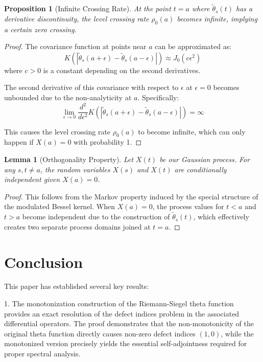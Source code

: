 \documentclass{article}
\newtheorem{lemma}[theorem]{Lemma}
\newtheorem{proposition}[theorem]{Proposition}
\theoremstyle{definition}
\begin{document}
\begin{proposition}[Infinite Crossing Rate]
At the point $t = a$ where $\tilde{\theta}_s(t)$ has a derivative discontinuity, the level crossing rate $\rho_0(a)$ becomes infinite, implying a certain zero crossing.
\end{proposition}

\begin{proof}
The covariance function at points near $a$ can be approximated as:
\begin{equation}
K(|\tilde{\theta}_s(a+\epsilon) - \tilde{\theta}_s(a-\epsilon)|) \approx J_0(c\epsilon^2)
\end{equation}
where $c > 0$ is a constant depending on the second derivatives.

The second derivative of this covariance with respect to $\epsilon$ at $\epsilon = 0$ becomes unbounded due to the non-analyticity at $a$. Specifically:
\begin{equation}
\lim_{\epsilon \to 0} \frac{d^2}{d\epsilon^2}K(|\tilde{\theta}_s(a+\epsilon) - \tilde{\theta}_s(a-\epsilon)|) = \infty
\end{equation}

This causes the level crossing rate $\rho_0(a)$ to become infinite, which can only happen if $X(a) = 0$ with probability 1.
\end{proof}

\begin{lemma}[Orthogonality Property]
Let $X(t)$ be our Gaussian process. For any $s, t \neq a$, the random variables $X(s)$ and $X(t)$ are conditionally independent given $X(a) = 0$.
\end{lemma}

\begin{proof}
This follows from the Markov property induced by the special structure of the modulated Bessel kernel. When $X(a) = 0$, the process values for $t < a$ and $t > a$ become independent due to the construction of $\tilde{\theta}_s(t)$, which effectively creates two separate process domains joined at $t = a$.
\end{proof}

\section{Conclusion}

This paper has established several key results:

1. The monotonization construction of the Riemann-Siegel theta function provides an exact resolution of the defect indices problem in the associated differential operators. The proof demonstrates that the non-monotonicity of the original theta function directly causes non-zero defect indices $(1,0)$, while the monotonized version precisely yields the essential self-adjointness required for proper spectral analysis.
\end{document}
